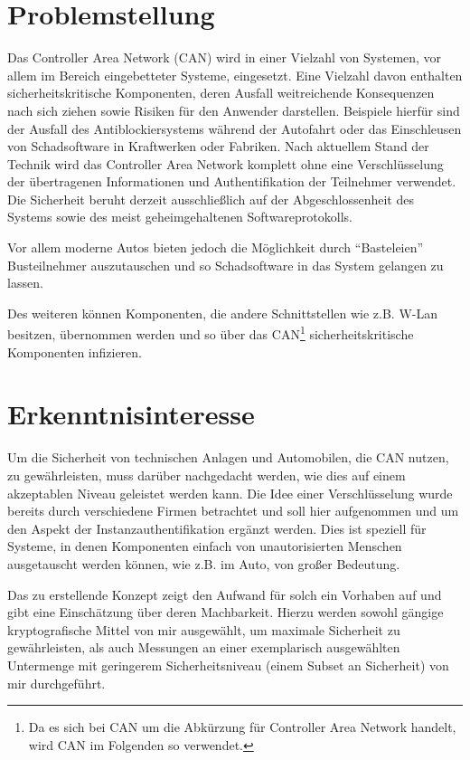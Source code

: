 \section{Problemstellung}
Das Controller Area Network (CAN) wird in einer Vielzahl von Systemen, vor allem im Bereich eingebetteter Systeme, eingesetzt. Eine Vielzahl davon enthalten sicherheitskritische Komponenten, deren Ausfall weitreichende Konsequenzen nach sich ziehen sowie Risiken für den Anwender darstellen. Beispiele hierfür sind der Ausfall des Antiblockiersystems während der Autofahrt oder das Einschleusen von Schadsoftware in Kraftwerken oder Fabriken.
 Nach aktuellem Stand der Technik wird das Controller Area Network komplett ohne eine Verschlüsselung der übertragenen Informationen und Authentifikation der Teilnehmer verwendet. Die Sicherheit beruht derzeit ausschließlich auf der Abgeschlossenheit des Systems sowie des meist geheimgehaltenen Softwareprotokolls. 

Vor allem moderne Autos bieten jedoch die Möglichkeit durch "`Basteleien"' Busteilnehmer auszutauschen und so Schadsoftware in das System gelangen zu lassen. 

Des weiteren können Komponenten, die andere Schnittstellen wie z.B. W-Lan besitzen, übernommen werden und so über das CAN\footnote{Da es sich bei CAN um die Abkürzung für Controller Area Network handelt, wird CAN im Folgenden so verwendet.} sicherheitskritische Komponenten infizieren. 

\section{Erkenntnisinteresse}
Um die Sicherheit von technischen Anlagen und Automobilen, die CAN nutzen, zu gewährleisten, muss darüber nachgedacht werden, wie dies auf einem akzeptablen Niveau geleistet werden kann. Die Idee einer Verschlüsselung wurde bereits durch verschiedene Firmen betrachtet und soll hier aufgenommen und um den Aspekt der Instanzauthentifikation ergänzt werden. Dies ist speziell für Systeme, in denen Komponenten einfach von unautorisierten Menschen ausgetauscht werden können, wie z.B. im Auto, von großer Bedeutung.

Das zu erstellende Konzept zeigt den Aufwand für solch ein Vorhaben auf und gibt eine Einschätzung über deren Machbarkeit. Hierzu werden sowohl gängige kryptografische Mittel von mir ausgewählt, um maximale Sicherheit zu gewährleisten, als auch Messungen an einer exemplarisch ausgewählten Untermenge mit geringerem Sicherheitsniveau (einem Subset an Sicherheit) von mir durchgeführt. 


